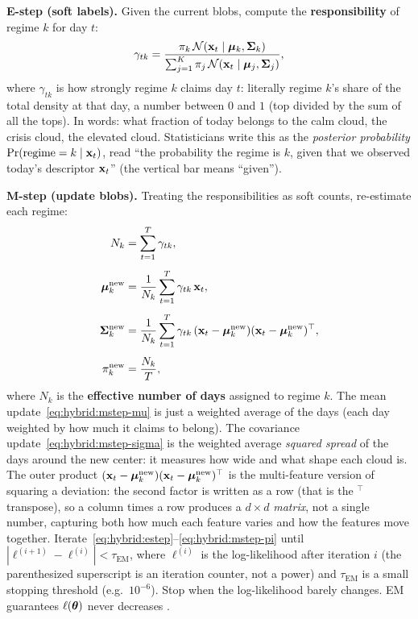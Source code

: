 \begin{keyidea}
\textbf{E-step (soft labels).}  Given the current blobs, compute the
\textbf{responsibility} of regime $k$ for day $t$:
\begin{equation}\label{eq:hybrid:estep}
  \gamma_{tk} = \frac{\pi_k\,\mathcal{N}(\mathbf{x}_t \mid \bm{\mu}_k, \bm{\Sigma}_k)}
    {\sum_{j=1}^{K} \pi_j\,\mathcal{N}(\mathbf{x}_t \mid \bm{\mu}_j, \bm{\Sigma}_j)},
\end{equation}
where $\gamma_{tk}$ is how strongly regime $k$ claims day $t$:
literally regime $k$'s share of the total density at that day, a number
between $0$ and $1$ (top divided by the sum of all the tops).  In words:
what fraction of today belongs to the calm cloud, the crisis cloud, the
elevated cloud.  Statisticians write this as the \emph{posterior
probability} $\Pr(\text{regime}=k \mid \mathbf{x}_t)$, read ``the probability the
regime is $k$, given that we observed today's descriptor $\mathbf{x}_t$'' (the
vertical bar means ``given'').

\textbf{M-step (update blobs).}  Treating the responsibilities as soft
counts, re-estimate each regime:
\begin{align}
  N_k &= \sum_{t=1}^{T} \gamma_{tk}, \label{eq:hybrid:mstep-n}\\[4pt]
  \bm{\mu}_k^{\text{new}} &= \frac{1}{N_k}
    \sum_{t=1}^{T} \gamma_{tk}\,\mathbf{x}_t, \label{eq:hybrid:mstep-mu}\\[4pt]
  \bm{\Sigma}_k^{\text{new}} &= \frac{1}{N_k}
    \sum_{t=1}^{T} \gamma_{tk}\,(\mathbf{x}_t - \bm{\mu}_k^{\text{new}})
    (\mathbf{x}_t - \bm{\mu}_k^{\text{new}})^\top, \label{eq:hybrid:mstep-sigma}\\[4pt]
  \pi_k^{\text{new}} &= \frac{N_k}{T}, \label{eq:hybrid:mstep-pi}
\end{align}
where $N_k$ is the \textbf{effective number of days} assigned to regime
$k$.  The mean update~\eqref{eq:hybrid:mstep-mu} is just a weighted average
of the days (each day weighted by how much it claims to belong).  The
covariance update~\eqref{eq:hybrid:mstep-sigma} is the weighted average
\emph{squared spread} of the days around the new center: it measures how
wide and what shape each cloud is.  The outer product
$(\mathbf{x}_t - \bm{\mu}_k^{\text{new}})(\mathbf{x}_t - \bm{\mu}_k^{\text{new}})^\top$ is
the multi-feature version of squaring a deviation: the second factor is
written as a row (that is the $^\top$ transpose), so a column times a row
produces a $d\times d$ \emph{matrix}, not a single number, capturing both
how much each feature varies and how the features move together.
Iterate~\eqref{eq:hybrid:estep}--\eqref{eq:hybrid:mstep-pi} until
$|\ell^{(i+1)} - \ell^{(i)}| < \tau_{\text{EM}}$, where $\ell^{(i)}$ is the
log-likelihood after iteration $i$ (the parenthesized superscript is an
iteration counter, not a power) and $\tau_{\text{EM}}$ is a small stopping
threshold (e.g.\ $10^{-6}$).  Stop when the log-likelihood barely changes.
EM guarantees $\ell(\bm{\theta})$ never decreases
\citep{DempsterLairdRubin1977}.
\end{keyidea}

